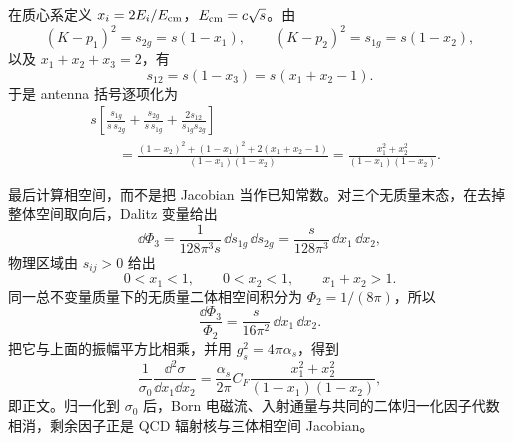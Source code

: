 \begin{derivation}[三喷注产生的能量分布]
在质心系定义 $x_i=2E_i/E_{\rm cm}$，$E_{\rm cm}=c\sqrt s$。由
\begin{equation*}
(K-p_1)^2=s_{2g}=s(1-x_1),\qquad
(K-p_2)^2=s_{1g}=s(1-x_2),
\end{equation*}
以及 $x_1+x_2+x_3=2$，有
\begin{equation*}
s_{12}=s(1-x_3)=s(x_1+x_2-1).
\end{equation*}
于是 antenna 括号逐项化为
\begin{align*}
&s\left[
\frac{s_{1g}}{s\,s_{2g}}
+\frac{s_{2g}}{s\,s_{1g}}
+\frac{2s_{12}}{s_{1g}s_{2g}}
\right]\\
&\qquad=
\frac{(1-x_2)^2+(1-x_1)^2+2(x_1+x_2-1)}{(1-x_1)(1-x_2)}
=\frac{x_1^2+x_2^2}{(1-x_1)(1-x_2)}.
\end{align*}

最后计算相空间，而不是把 Jacobian 当作已知常数。对三个无质量末态，在去掉整体空间取向后，Dalitz 变量给出
\begin{equation*}
\dd\Phi_3
=\frac{1}{128\pi^3s}\,\dd s_{1g}\,\dd s_{2g}
=\frac{s}{128\pi^3}\,\dd x_1\,\dd x_2,
\end{equation*}
物理区域由 $s_{ij}>0$ 给出
\begin{equation*}
0<x_1<1,\qquad0<x_2<1,\qquad x_1+x_2>1.
\end{equation*}
同一总不变量质量下的无质量二体相空间积分为 $\Phi_2=1/(8\pi)$，所以
\begin{equation*}
\frac{\dd\Phi_3}{\Phi_2}
=\frac{s}{16\pi^2}\,\dd x_1\,\dd x_2.
\end{equation*}
把它与上面的振幅平方比相乘，并用 $g_s^2=4\pi\alpha_s$，得到
\begin{equation*}
\frac1{\sigma_0}
\frac{\dd^2\sigma}{\dd x_1\dd x_2}
=\frac{\alpha_s}{2\pi}C_F
\frac{x_1^2+x_2^2}{(1-x_1)(1-x_2)},
\end{equation*}
即正文。归一化到 $\sigma_0$ 后，Born 电磁流、入射通量与共同的二体归一化因子代数相消，剩余因子正是 QCD 辐射核与三体相空间 Jacobian。
\end{derivation}

